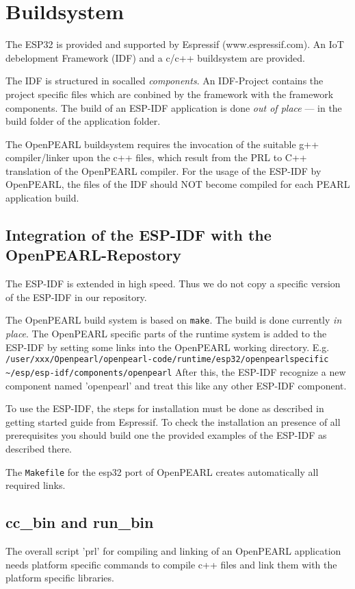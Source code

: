 \section{Buildsystem}

The ESP32 is provided and supported by Espressif (www.espressif.com).
An IoT debelopment Framework (IDF) and a c/c++ buildsystem are provided. 

The IDF is structured in socalled {\em components}. An IDF-Project contains
the project specific files which are conbined by the framework with the 
framework components. The build of an ESP-IDF application is done 
{\em out of place} --- in the build folder of the application folder.

The OpenPEARL buildsystem requires the invocation of the suitable 
g++ compiler/linker upon the c++ files, which result from the PRL to C++ 
translation of the OpenPEARL compiler.
For the usage of the ESP-IDF by OpenPEARL, the files of the IDF should NOT 
become compiled for each PEARL application build.

\subsection{Integration of the ESP-IDF with the OpenPEARL-Repostory}
The ESP-IDF is extended in high speed. Thus we do not copy a specific
version of the ESP-IDF in our repository.

The OpenPEARL build system is based on \verb|make|. The build is done 
currently {\em in place}.
The OpenPEARL specific parts of the runtime system is added to the ESP-IDF
by setting some links into the OpenPEARL working directory.
E.g. \verb|/user/xxx/Openpearl/openpearl-code/runtime/esp32/openpearlspecific ~/esp/esp-idf/components/openpearl|
After this, the ESP-IDF recognize a new component named 'openpearl' and
 treat this like any other ESP-IDF component.

To use the ESP-IDF, the steps for installation must be done as described in 
getting started guide from Espressif.
To check the installation an presence of all prerequisites you should build
 one the provided examples of the ESP-IDF as described there.

The \verb|Makefile|  for the esp32 port of OpenPEARL creates automatically all
required links.

\subsection{cc\_bin and run\_bin}
The overall script 'prl' for compiling and linking of an OpenPEARL application
needs platform specific commands to compile c++ files and link them with the 
platform specific libraries.

